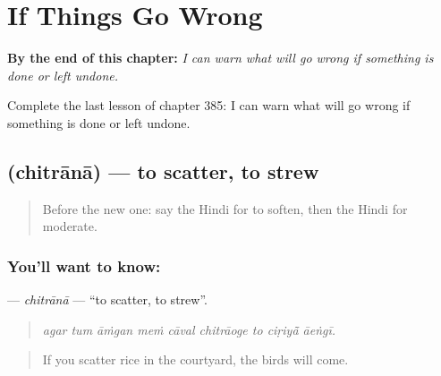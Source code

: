 
\chapter{If Things Go Wrong}
\label{ch:hi-if-things-go-wrong}

\begin{chapteropening}
\textbf{By the end of this chapter:} \emph{I can warn what will go wrong if something is done or left undone.}

Complete the last lesson of chapter 385: I can warn what will go wrong if something is done or left undone.
\end{chapteropening}

\section[\texorpdfstring{\hi{छितराना} (chitrānā)}{छितराना (chitrānā)}]{ (chitrānā) — to scatter, to strew}

\label{lesson:HI-C385-chitrana}



\begin{quote}
Before the new one: say the Hindi for to soften, then the Hindi for moderate.
\end{quote}

\subsection*{You'll want to know: }
\textbf{} — \emph{chitrānā} — \textquotedblleft{}to scatter, to strew\textquotedblright{}.

\begin{quote}
        
\end{quote}

\begin{quote}
\emph{agar tum āṁgan meṁ cāval chitrāoge to ciṛiyā̃ āeṅgī.}
\end{quote}

\begin{quote}
If you scatter rice in the courtyard, the birds will come.
\end{quote}

